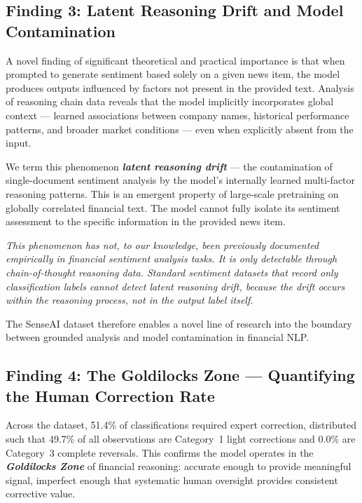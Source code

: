 \documentclass[11pt,a4paper]{article}
\begin{document}
\subsection{Finding 3: Latent Reasoning Drift and Model Contamination}

A novel finding of significant theoretical and practical importance is that when
prompted to generate sentiment based solely on a given news item, the model
produces outputs influenced by factors not present in the provided text. Analysis of
reasoning chain data reveals that the model implicitly incorporates global context ---
learned associations between company names, historical performance patterns, and
broader market conditions --- even when explicitly absent from the input.

We term this phenomenon \textbf{\textit{latent reasoning drift}} --- the contamination of
single-document sentiment analysis by the model's internally learned multi-factor
reasoning patterns. This is an emergent property of large-scale pretraining on
globally correlated financial text. The model cannot fully isolate its sentiment
assessment to the specific information in the provided news item.

\begin{mdframed}[style=quotestyle]
\textit{This phenomenon has not, to our knowledge, been previously documented
empirically in financial sentiment analysis tasks. It is only detectable through
chain-of-thought reasoning data. Standard sentiment datasets that record only
classification labels cannot detect latent reasoning drift, because the drift occurs
within the reasoning process, not in the output label itself.}
\end{mdframed}

The SenseAI dataset therefore enables a novel line of research into the boundary
between grounded analysis and model contamination in financial NLP.

\subsection{Finding 4: The Goldilocks Zone --- Quantifying the Human Correction Rate}

Across the dataset, 51.4\% of classifications required expert correction, distributed
such that 49.7\% of all observations are Category~1 light corrections and 0.0\% are
Category~3 complete reversals. This confirms the model operates in the
\textbf{\textit{Goldilocks Zone}} of financial reasoning: accurate enough to provide
meaningful signal, imperfect enough that systematic human oversight provides
consistent corrective value.
\end{document}
